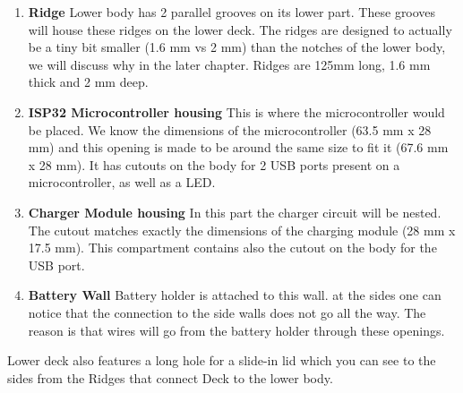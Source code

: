 \begin{enumerate}
	\item{\textbf{Ridge}} Lower body has 2 parallel grooves on its lower part. These grooves will house these ridges on the lower deck. The ridges are designed to actually be a tiny bit smaller (1.6 mm vs 2 mm) than the notches of the lower body, we will discuss why in the later chapter. Ridges are 125mm long, 1.6 mm thick and 2 mm deep. 
	\item{\textbf{ISP32 Microcontroller housing}} This is where the microcontroller would be placed. We know the dimensions of the microcontroller (63.5 mm x 28 mm) and this opening is made to be around the same size to fit it (67.6 mm x 28 mm). It has cutouts on the body for 2 USB ports present on a microcontroller, as well as a LED.
	\item{\textbf{Charger Module housing}} In this part the charger circuit will be nested. The cutout matches exactly the dimensions of the charging module (28 mm x 17.5 mm). This compartment contains also the cutout on the body for the USB port.
	\item{\textbf{Battery Wall}} Battery holder is attached to this wall. at the sides one can notice that the connection to the side walls does not go all the way. The reason is that wires will go from the battery holder through these openings. 
\end{enumerate}
Lower deck also features a long hole for a slide-in lid which you can see to the sides from the Ridges that connect Deck to the lower body.
\newpage
